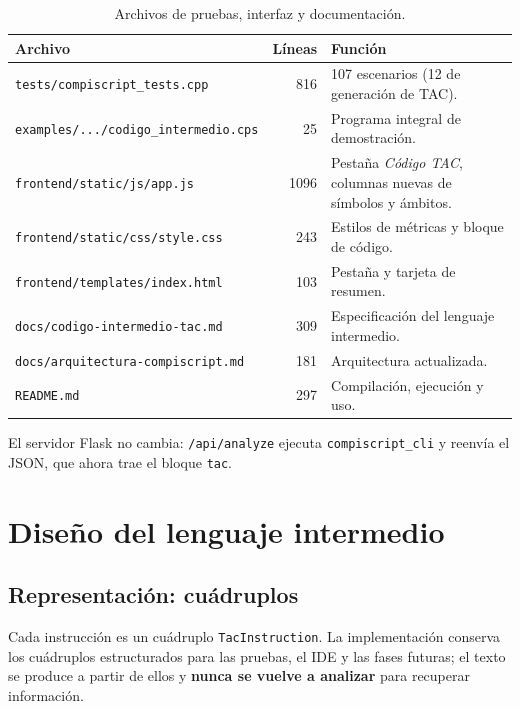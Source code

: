 \documentclass[11pt,a4paper]{article}
\begin{document}
\begin{table}[H]
\centering
\small
\begin{tabular}{@{}L{6.5cm}rL{6.1cm}@{}}
\toprule
\textbf{Archivo} & \textbf{Líneas} & \textbf{Función} \\
\midrule
\texttt{tests/compiscript\_tests.cpp} & 816 &
107 escenarios (12 de generación de TAC). \\
\texttt{examples/.../codigo\_intermedio.cps} & 25 &
Programa integral de demostración. \\
\texttt{frontend/static/js/app.js} & 1096 &
Pestaña \emph{Código TAC}, columnas nuevas de símbolos y ámbitos. \\
\texttt{frontend/static/css/style.css} & 243 & Estilos de métricas y bloque de código. \\
\texttt{frontend/templates/index.html} & 103 & Pestaña y tarjeta de resumen. \\
\texttt{docs/codigo-intermedio-tac.md} & 309 &
Especificación del lenguaje intermedio. \\
\texttt{docs/arquitectura-compiscript.md} & 181 & Arquitectura actualizada. \\
\texttt{README.md} & 297 & Compilación, ejecución y uso. \\
\bottomrule
\end{tabular}
\caption{Archivos de pruebas, interfaz y documentación.}
\end{table}

El servidor Flask no cambia: \texttt{/api/analyze} ejecuta \texttt{compiscript\_cli}
y reenvía el JSON, que ahora trae el bloque \texttt{tac}.

\section{Diseño del lenguaje intermedio}

\subsection{Representación: cuádruplos}

Cada instrucción es un cuádruplo \texttt{TacInstruction}. La implementación
conserva los cuádruplos estructurados para las pruebas, el IDE y las fases
futuras; el texto se produce a partir de ellos y \textbf{nunca se vuelve a
analizar} para recuperar información.
\end{document}
